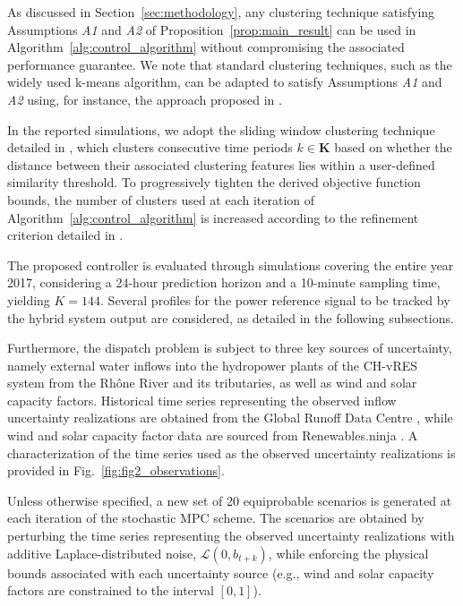 \documentclass[a4paper,fleqn]{cas-sc}
\begin{document}
As discussed in Section~\ref{sec:methodology}, any clustering technique satisfying Assumptions \textit{A1} and \textit{A2} of Proposition~\ref{prop:main_result} can be used in Algorithm~\ref{alg:control_algorithm} without compromising the associated performance guarantee.
We note that standard clustering techniques, such as the widely used k-means algorithm, can be adapted to satisfy Assumptions \textit{A1} and \textit{A2} using, for instance, the approach proposed in \cite{moradi2023capturing}.

In the reported simulations, we adopt the sliding window clustering technique detailed in \cite{santosuosso2026stochastic},
which clusters consecutive time periods $k \in \boldsymbol{K}$ based on whether the distance between their associated clustering features lies within a user-defined similarity threshold.
To progressively tighten the derived objective function bounds, the number of clusters used at each iteration of Algorithm~\ref{alg:control_algorithm} is increased according to the refinement criterion detailed in \cite{santosuosso2026stochastic}.

The proposed controller is evaluated through simulations covering the entire year 2017,
considering a 24-hour prediction horizon and a 10-minute sampling time, yielding $K = 144$.
Several profiles for the power reference signal to be tracked by the hybrid system output are considered, as detailed in the following subsections.

Furthermore, the dispatch problem is subject to three key sources of uncertainty, namely external water inflows into the hydropower plants of the CH-vRES system from the Rhône River and its tributaries, as well as wind and solar capacity factors.
Historical time series representing the observed inflow uncertainty realizations are obtained from the Global Runoff Data Centre \citep{farber2025grdc},
while wind and solar capacity factor data are sourced from Renewables.ninja \citep{pfenninger2016long}.
A characterization of the time series used as the observed uncertainty realizations is provided in Fig.~\ref{fig:fig2_observations}.

Unless otherwise specified, a new set of 20 equiprobable scenarios is generated at each iteration of the stochastic MPC scheme.
The scenarios are obtained by perturbing the time series representing the observed uncertainty realizations with additive Laplace-distributed noise, $\mathcal{L}(0, b_{t+k})$,
while enforcing the physical bounds associated with each uncertainty source
(e.g., wind and solar capacity factors are constrained to the interval $[0,1]$).
\end{document}
